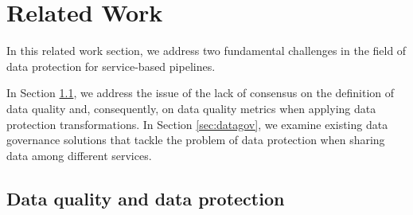 \section{Related Work}\label{sec:related}

{\color{OurColor}
    In this related work section, we address two fundamental challenges in the field of data protection for service-based pipelines.

    In Section  \ref{sec:dataquality}, we address the issue of the lack of consensus on the definition of data quality and, consequently, on data quality metrics when applying data protection transformations. In Section \ref{sec:datagov}, we examine existing data governance solutions that tackle the problem of data protection when sharing data among different services.
}
\subsection{Data quality and data protection}\label{sec:dataquality}

